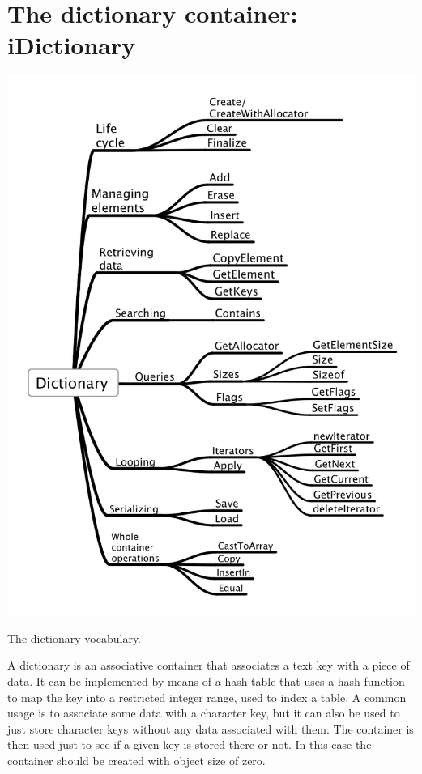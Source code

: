 \documentclass[12pt,a4paper]{memoir} %
\begin{document}
{{\section{The dictionary container: iDictionary}
\includegraphics[scale=0.53]{Dictionary.png}\par\noindent\hfill The dictionary vocabulary.\par

A dictionary is an associative container that associates a text key with a piece of data. It can be implemented by means of a hash table that uses a hash function to map the key into a restricted integer range, used to index a table. A common usage is to associate some data with a character key,
but it can also be used to just store character keys without any data associated with them. The container is then used just to see if a given key
is stored there or not. In this case the container should be created with object size of zero.

}}
\end{document}
